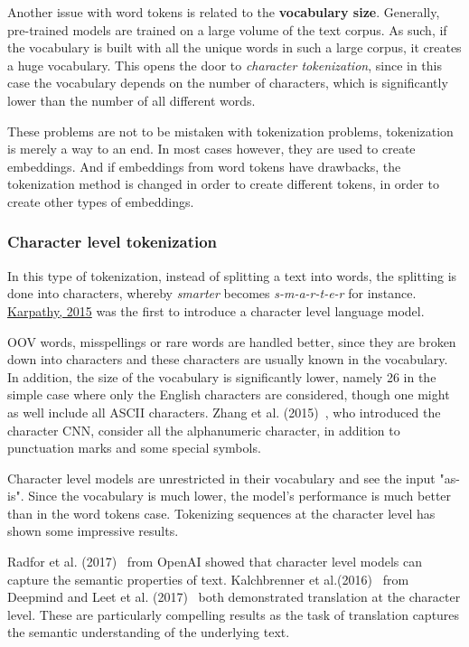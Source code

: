 Another issue with word tokens is related to the \textbf{vocabulary size}. Generally, pre-trained models are trained on a large volume of the text corpus. As such, if the vocabulary is built with all the unique words in such a large corpus, it creates a huge vocabulary. This opens the door to \emph{character tokenization}, since in this case the vocabulary depends on the number of characters, which is significantly lower than the number of all different words.

These problems are not to be mistaken with tokenization problems, tokenization is merely a way to an end. In most cases however, they are used to create embeddings. And if embeddings from word tokens have drawbacks, the tokenization method is changed in order to create different tokens, in order to create other types of embeddings.
    
\subsubsection{Character level tokenization}

In this type of tokenization, instead of splitting a text into words, the splitting is done into characters, whereby \emph{smarter} becomes \emph{s-m-a-r-t-e-r} for instance. \href{https://github.com/karpathy/char-rnn}{Karpathy, 2015} was the first to introduce a character level language model.

OOV words, misspellings or rare words are handled better, since they are broken down into characters and these characters are usually known in the vocabulary. In addition, the size of the vocabulary is significantly lower, namely 26 in the simple case where only the English characters are considered, though one might as well include all ASCII characters. Zhang et al. (2015)~\cite{zhang2015text}, who introduced the character CNN, consider all the alphanumeric character, in addition to punctuation marks and some special symbols.

Character level models are unrestricted in their vocabulary and see the input "as-is". Since the vocabulary is much lower, the model's performance is much better than in the word tokens case. Tokenizing sequences at the character level has shown some impressive results.

Radfor et al. (2017)~\cite{radford2017learning} from OpenAI showed that character level models can capture the semantic properties of text. Kalchbrenner et al.(2016)~\cite{kalchbrenner2016neural} from Deepmind and Leet et al. (2017)~\cite{lee-etal-2017-fully} both demonstrated translation at the character level. These are particularly compelling results as the task of translation captures the semantic understanding of the underlying text.

